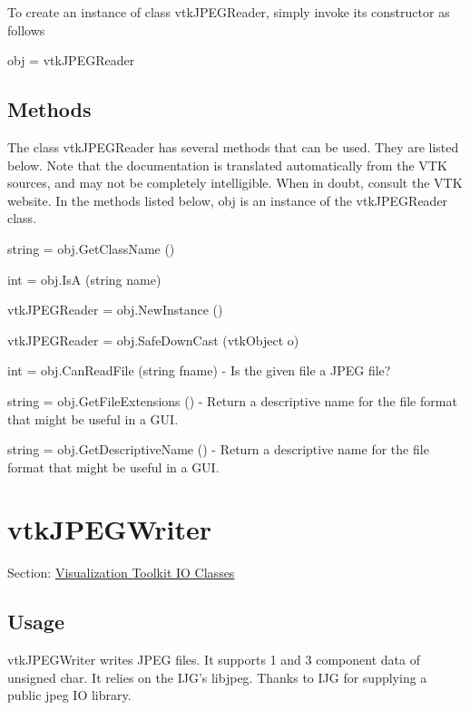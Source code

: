To create an instance of class vtk\-J\-P\-E\-G\-Reader, simply invoke its constructor as follows \begin{DoxyVerb}  obj = vtkJPEGReader
\end{DoxyVerb}
 \hypertarget{vtkwidgets_vtkxyplotwidget_Methods}{}\subsection{Methods}\label{vtkwidgets_vtkxyplotwidget_Methods}
The class vtk\-J\-P\-E\-G\-Reader has several methods that can be used. They are listed below. Note that the documentation is translated automatically from the V\-T\-K sources, and may not be completely intelligible. When in doubt, consult the V\-T\-K website. In the methods listed below, {\ttfamily obj} is an instance of the vtk\-J\-P\-E\-G\-Reader class. 
\begin{DoxyItemize}
\item {\ttfamily string = obj.\-Get\-Class\-Name ()}  
\item {\ttfamily int = obj.\-Is\-A (string name)}  
\item {\ttfamily vtk\-J\-P\-E\-G\-Reader = obj.\-New\-Instance ()}  
\item {\ttfamily vtk\-J\-P\-E\-G\-Reader = obj.\-Safe\-Down\-Cast (vtk\-Object o)}  
\item {\ttfamily int = obj.\-Can\-Read\-File (string fname)} -\/ Is the given file a J\-P\-E\-G file?  
\item {\ttfamily string = obj.\-Get\-File\-Extensions ()} -\/ Return a descriptive name for the file format that might be useful in a G\-U\-I.  
\item {\ttfamily string = obj.\-Get\-Descriptive\-Name ()} -\/ Return a descriptive name for the file format that might be useful in a G\-U\-I.  
\end{DoxyItemize}\hypertarget{vtkio_vtkjpegwriter}{}\section{vtk\-J\-P\-E\-G\-Writer}\label{vtkio_vtkjpegwriter}
Section\-: \hyperlink{sec_vtkio}{Visualization Toolkit I\-O Classes} \hypertarget{vtkwidgets_vtkxyplotwidget_Usage}{}\subsection{Usage}\label{vtkwidgets_vtkxyplotwidget_Usage}
vtk\-J\-P\-E\-G\-Writer writes J\-P\-E\-G files. It supports 1 and 3 component data of unsigned char. It relies on the I\-J\-G's libjpeg. Thanks to I\-J\-G for supplying a public jpeg I\-O library.

